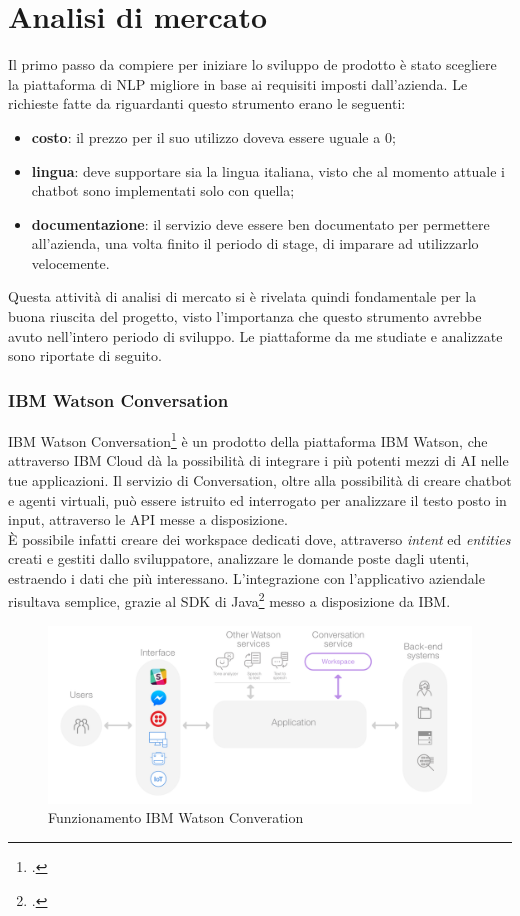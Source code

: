 \section{Analisi di mercato}
Il primo passo da compiere per iniziare lo sviluppo de prodotto è stato scegliere la piattaforma di \gls{NLP} migliore in base ai requisiti imposti dall'azienda. Le richieste fatte da \azienda{} riguardanti questo strumento erano le seguenti:
\begin{itemize}
	\item \textbf{costo}: il prezzo per il suo utilizzo doveva essere uguale a 0;
	\item \textbf{lingua}: deve supportare sia la lingua italiana, visto che al momento attuale i \gls{chatbot} sono implementati solo con quella;
	\item \textbf{documentazione}: il servizio deve essere ben documentato per permettere all'azienda, una volta finito il periodo di stage, di imparare ad utilizzarlo velocemente.
\end{itemize}

Questa attività di analisi di mercato si è rivelata quindi fondamentale per la buona riuscita del progetto, visto l'importanza che questo strumento avrebbe avuto nell'intero periodo di sviluppo. Le piattaforme da me studiate e analizzate sono riportate di seguito.

\subsubsection{IBM Watson Conversation}
IBM Watson Conversation\footcite{watson} è un prodotto della piattaforma IBM Watson, che attraverso IBM Cloud dà la possibilità di integrare i più potenti mezzi di AI nelle tue applicazioni. Il servizio di Conversation, oltre alla possibilità di creare \gls{chatbot} e agenti virtuali, può essere istruito ed interrogato per analizzare il testo posto in input, attraverso le \gls{API} messe a disposizione.\\
È possibile infatti creare dei workspace dedicati dove, attraverso \emph{intent} ed \emph{entities} creati e gestiti dallo sviluppatore, analizzare le domande poste dagli utenti, estraendo i dati che più interessano. L'integrazione con l'applicativo aziendale risultava semplice, grazie al SDK di Java\footcite{watsonSDK} messo a disposizione da IBM.

\begin{figure}[h]
	\centering
	\includegraphics[scale=0.15]{../Immagini/conversation_arch_overview.png}
	\caption{Funzionamento IBM Watson Converation}
\end{figure}

